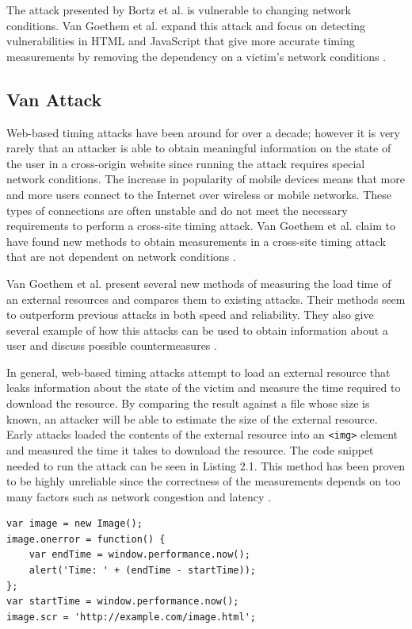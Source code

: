 \documentclass[10pt,a4paper,twoside]{book}
\begin{document}
The attack presented by Bortz et al. \cite{bortz2007exposing} is vulnerable to changing network conditions. Van Goethem et al. expand this attack and focus on detecting vulnerabilities in HTML and JavaScript that give more accurate timing measurements by removing the dependency on a victim's network  conditions \cite{van2015clock}.

\subsection{Van Attack}

Web-based timing attacks have been around for over a decade; however it is very rarely that an attacker is able to obtain meaningful information on the state of the user in a cross-origin website since running the attack requires special network conditions. The increase in popularity of mobile devices means that more and more users connect to the Internet over wireless or mobile networks. These types of connections are often unstable and do not meet the necessary requirements to perform a cross-site timing attack. Van Goethem et al. claim to have found new methods to obtain measurements in a cross-site timing attack that are not dependent on network conditions \cite{van2015clock}.

Van Goethem et al. present several new methods of measuring the load time of an external resources and compares them to existing attacks. Their methods seem to outperform previous attacks in both speed and reliability. They also give several example of how this attacks can be used to obtain information about a user and discuss possible countermeasures \cite{van2015clock}.

In general, web-based timing attacks attempt to load an external resource that leaks information about the state of the victim and measure the time required to download the resource. By comparing the result against a file whose size is known, an attacker will be able to estimate the size of the external resource. Early attacks loaded the contents of the external resource into an \texttt{<img>} element and measured the time it takes to download the resource. The code snippet needed to run the attack can be seen in Listing 2.1. This method has been proven to be highly unreliable since the correctness of the measurements depends on too many factors such as network congestion and latency \cite{van2015clock}. 

\begin{lstlisting}[caption={Example timing attack using Image.},label={img}, xleftmargin=.2\textwidth]
var image = new Image();
image.onerror = function() {
	var endTime = window.performance.now();
	alert('Time: ' + (endTime - startTime));
};
var startTime = window.performance.now();
image.scr = 'http://example.com/image.html';
\end{lstlisting}
\end{document}
